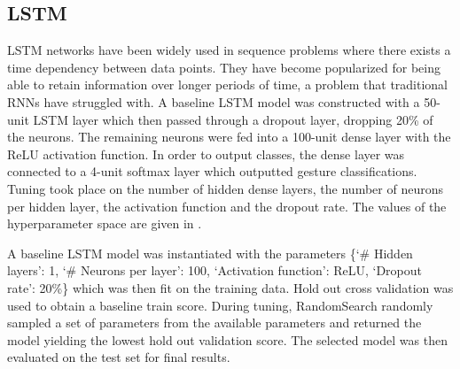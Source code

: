 \documentclass[journal]{IEEEtran}
\begin{document}
	\subsection{LSTM}
	LSTM networks have been widely used in sequence problems where there exists a time dependency between data points. They have become popularized for being able to retain information over longer periods of time, a problem that traditional RNNs have struggled with. A baseline LSTM model was constructed with a 50-unit LSTM layer which then passed through a dropout layer, dropping 20\% of the neurons. The remaining neurons were fed into a 100-unit dense layer with the ReLU activation function. In order to output classes, the dense layer was connected to a 4-unit softmax layer which outputted gesture classifications. Tuning took place on the number of hidden dense layers, the number of neurons per hidden layer, the activation function and the dropout rate. The values of the hyperparameter space are given in .
	
	\begingroup
	\def\arraystretch{1.2}%
	\setlength{\tabcolsep}{2pt} %
	\begin{table}[t]
		\centering
		\caption{LSTM Hyperparameter Tuning Space.}
		\label{table:lstm_param}
	\end{table}%
	\endgroup
	
	A baseline LSTM model was instantiated with the parameters \{‘\# Hidden layers’: 1,  ‘\# Neurons per layer’: 100, ‘Activation function’: ReLU, ‘Dropout rate’: 20\%\} which was then fit on the training data. Hold out cross validation was used to obtain a baseline train score. During tuning, RandomSearch randomly sampled a set of parameters from the available parameters and returned the model yielding the lowest hold out validation score. The selected model was then evaluated on the test set for final results.
	
\end{document}
